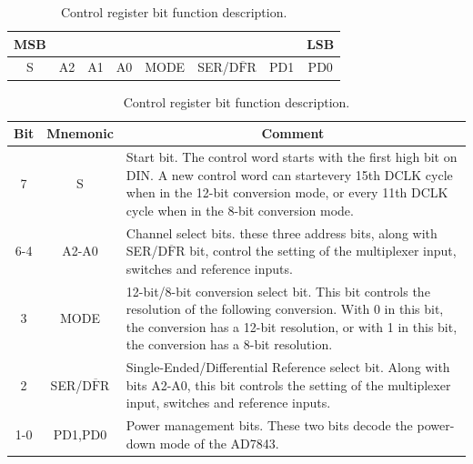 \documentclass[11pt]{report}
\begin{document}
\begin{table}[!h]
\caption{Control register bit function description.}
\label{tab:adc_control_word}
\renewcommand{\arraystretch}{1.5}
\centering
\begin{tabular}{|cccccccc|}
\hline
\textbf{MSB}                     &                         &                         &                         &                           &                              &                          & \textbf{LSB} \\ \hline
\multicolumn{1}{|c|}{S} & \multicolumn{1}{c|}{A2} & \multicolumn{1}{c|}{A1} & \multicolumn{1}{c|}{A0} & \multicolumn{1}{c|}{MODE} & \multicolumn{1}{c|}{SER/$\overline{\text{DFR}}$} & \multicolumn{1}{c|}{PD1} & PD0 \\ \hline
\end{tabular}

\medskip
\begin{tabular}{|c|c|p{120mm}|}
\hline
\textbf{Bit} & \textbf{Mnemonic} & \multicolumn{1}{c|}{\textbf{Comment}} \\ \hline
7            & S                 &  Start bit. The control word starts with the first high bit on DIN. A new control word can startevery 15th DCLK cycle when in the 12-bit conversion mode, or every 11th DCLK cycle when in the 8-bit conversion mode.               \\ \hline
6-4          & A2-A0             & Channel select bits. these three address bits, along with SER/$\overline{\text{DFR}}$ bit, control the setting of the multiplexer input, switches and reference inputs.                 \\ \hline
3            & MODE              & 12-bit/8-bit conversion select bit. This bit controls the resolution of the following conversion. With 0 in this bit, the conversion has a 12-bit resolution, or with 1 in this bit, the conversion has a 8-bit resolution.                 \\ \hline
2            & SER/$\overline{\text{DFR}}$           & Single-Ended/Differential Reference select bit. Along with bits A2-A0, this bit controls the setting of the multiplexer input, switches and reference inputs.                 \\ \hline
1-0          & PD1,PD0           & Power management bits. These two bits decode the power-down mode of the AD7843.                 \\ \hline
\end{tabular}
\end{table}
\end{document}
